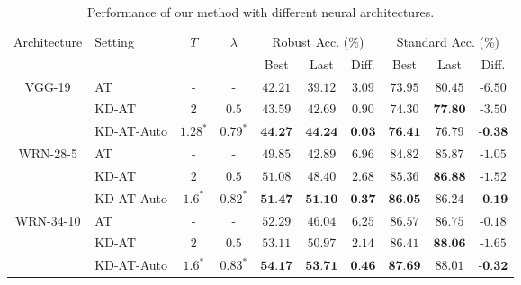 \begin{table}[!ht]
  \small
  \caption{Performance of our method with different neural architectures.
   }
  \vspace{0.5ex}
  \label{table:result-model}
  \centering
  \small
  \begin{tabular}{clcccccccc}
    \toprule
    \multirow{2}{*}{Architecture} & \multirow{2}{*}{Setting} & \multirow{2}{*}{$T$} & \multirow{2}{*}{$\lambda$} & \multicolumn{3}{c}{Robust Acc. (\%)} & \multicolumn{3}{c}{Standard Acc. (\%)}\\
     & & &  & Best & Last & Diff. & Best & Last & Diff.\\
    \midrule
\multirow{3}{*}{VGG-19} 
& AT & - & - &  $42.21$ & $39.12$ & $ 3.09$ &  $73.95$ &  $80.45$ & -$6.50$ \\ 
& KD-AT & $2$ & $0.5$ &  $43.59$ & $42.69$ & $ 0.90$ &  $74.30$ &  $\textbf{77.80}$ & -$3.50$ \\ 
& KD-AT-Auto & $1.28^*$ & $0.79^*$ &  $\textbf{44.27}$ & $\textbf{44.24}$ & $ \textbf{0.03}$ &  $\textbf{76.41}$ &  $76.79$ & $\textbf{-0.38}$ \\ 
    \midrule
\multirow{3}{*}{WRN-28-5} 
& AT & - & - &  $49.85$ & $42.89$ & $ 6.96$ &  $84.82$ &  $85.87$ & -$1.05$ \\ 
& KD-AT & $2$ & $0.5$ &  $51.08$ & $48.40$ & $ 2.68$ &  $85.36$ &  $\textbf{86.88}$ & -$1.52$ \\ 
& KD-AT-Auto & $1.6^*$ & $0.82^*$ &  $\textbf{51.47}$ & $\textbf{51.10}$ & $\textbf{0.37}$ &  $\textbf{86.05}$ &  $86.24$ & $\textbf{-0.19}$ \\ 
    \midrule
\multirow{3}{*}{WRN-34-10} 
& AT & - & - &  $52.29$ & $46.04$ & $ 6.25$ &  $86.57$ &  $86.75$ & -$0.18$ \\ 
& KD-AT & $2$ & $0.5$ &  $53.11$ & $50.97$ & $ 2.14$ &  $86.41$ &  $\textbf{88.06}$ & -$1.65$ \\ 
& KD-AT-Auto & $1.6^*$ & $0.83^*$ &  $\textbf{54.17}$ & $\textbf{53.71}$ & $\textbf{0.46}$ &  $\textbf{87.69}$ &  $88.01$ & $\textbf{-0.32}$ \\ 
    \bottomrule
  \end{tabular}
\end{table}


